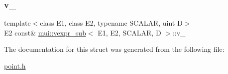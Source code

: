 \subsubsection{\texorpdfstring{v\+\_\+}{v\_}}
{\footnotesize\ttfamily template$<$class E1, class E2, typename S\+C\+A\+L\+AR, uint D$>$ \\
E2 const\& \hyperlink{structmui_1_1vexpr__sub}{mui\+::vexpr\+\_\+sub}$<$ E1, E2, S\+C\+A\+L\+AR, D $>$\+::v\+\_\+\hspace{0.3cm}{\ttfamily [protected]}}



The documentation for this struct was generated from the following file\+:\begin{DoxyCompactItemize}
\item 
\hyperlink{point_8h}{point.\+h}\end{DoxyCompactItemize}
